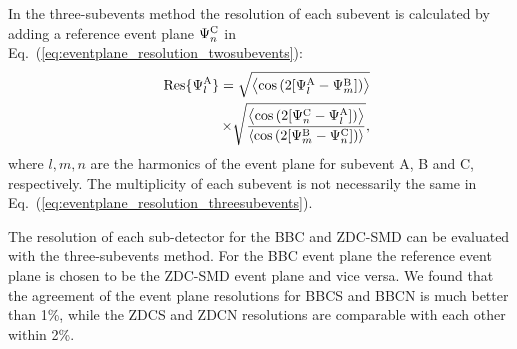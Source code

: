 \documentclass[aps,prc,superscriptaddress,showpacs,floatfix,twocolumn]{revtex4}
\begin{document}
In the three-subevents method the resolution of each subevent is calculated by adding a reference 
event plane $\Psi_n^{\rm C}$ in Eq.~(\ref{eq:eventplane_resolution_twosubevents}):  
\begin{eqnarray}
 & & \text{Res}\{\Psi_l^{\rm A}\} 
 = \sqrt{ \left< \cos{(2[\Psi_l^{\rm A} - \Psi_m^{\rm B}])} \right> } \nonumber \\
 & & \times \sqrt{ \frac{ \left< \cos{(2[\Psi_n^{\rm C} - \Psi_l^{\rm A}])} \right> }
 { \left< \cos{(2[\Psi_m^{\rm B} - \Psi_n^{\rm C}])} \right> } 
 },
 \label{eq:eventplane_resolution_threesubevents}
\end{eqnarray}
where $l, m, n$ are the harmonics of the event plane for subevent A, B and C, respectively. 
The multiplicity of each subevent is not necessarily the same in Eq.~(\ref{eq:eventplane_resolution_threesubevents}).

The resolution of each sub-detector for the BBC and ZDC-SMD can be evaluated with the 
three-subevents method. For the BBC event plane the reference event plane is chosen to be 
the ZDC-SMD event plane and vice versa. We found that the agreement of the event plane 
resolutions for BBCS and BBCN is much better than 1\%, while the ZDCS and ZDCN resolutions 
are comparable with each other within 2\%.
\end{document}
